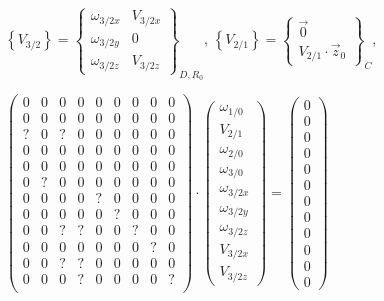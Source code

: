  $\left\{V_{3/2}\right\}=\left\{\begin{array}{cc}
 \omega_{3/2x} & V_{3/2x} \\
 \omega_{3/2y} & 0 \\
 \omega_{3/2z} & V_{3/2z} 
 \end{array}\right\}_{D,R_0}$,
 $\left\{V_{2/1}\right\}=\left\{\begin{array}{c}
 \vec{0} \\
 V_{2/1}\cdot\vec{z}_0 
 \end{array}\right\}_C$,



\begin{center}
$\left(\begin{array}{ccccccccc}
0&0&0&0&0&0&0&0&0\\
0&0&0&0&0&0&0&0&0\\
?&0&?&0&0&0&0&0&0\\
0&0&0&0&0&0&0&0&0\\
0&0&0&0&0&0&0&0&0\\
0&?&0&0&0&0&0&0&0\\
0&0&0&0&?&0&0&0&0\\
0&0&0&0&0&?&0&0&0\\
0&0&?&?&0&0&?&0&0\\
0&0&0&0&0&0&0&?&0\\
0&0&?&?&0&0&0&0&0\\
0&0&0&?&0&0&0&0&?\\
\end{array}\right)\cdot
\left(\begin{array}{c}
\omega_{1/0} \\
V_{2/1} \\
\omega_{2/0} \\
\omega_{3/0} \\
\omega_{3/2x} \\
\omega_{3/2y} \\
\omega_{3/2z} \\
V_{3/2x} \\
V_{3/2z}
\end{array}\right)=
\left(\begin{array}{c}
0\\0\\0\\0\\0\\0\\0\\0\\0\\0\\0\\0	
\end{array}\right)
$
\end{center}

